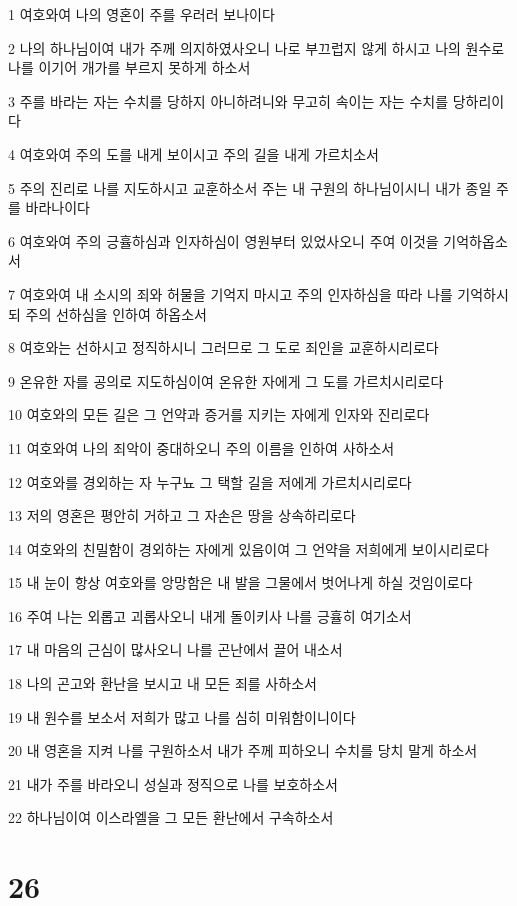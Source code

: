 \par 1 여호와여 나의 영혼이 주를 우러러 보나이다
\par 2 나의 하나님이여 내가 주께 의지하였사오니 나로 부끄럽지 않게 하시고 나의 원수로 나를 이기어 개가를 부르지 못하게 하소서
\par 3 주를 바라는 자는 수치를 당하지 아니하려니와 무고히 속이는 자는 수치를 당하리이다
\par 4 여호와여 주의 도를 내게 보이시고 주의 길을 내게 가르치소서
\par 5 주의 진리로 나를 지도하시고 교훈하소서 주는 내 구원의 하나님이시니 내가 종일 주를 바라나이다
\par 6 여호와여 주의 긍휼하심과 인자하심이 영원부터 있었사오니 주여 이것을 기억하옵소서
\par 7 여호와여 내 소시의 죄와 허물을 기억지 마시고 주의 인자하심을 따라 나를 기억하시되 주의 선하심을 인하여 하옵소서
\par 8 여호와는 선하시고 정직하시니 그러므로 그 도로 죄인을 교훈하시리로다
\par 9 온유한 자를 공의로 지도하심이여 온유한 자에게 그 도를 가르치시리로다
\par 10 여호와의 모든 길은 그 언약과 증거를 지키는 자에게 인자와 진리로다
\par 11 여호와여 나의 죄악이 중대하오니 주의 이름을 인하여 사하소서
\par 12 여호와를 경외하는 자 누구뇨 그 택할 길을 저에게 가르치시리로다
\par 13 저의 영혼은 평안히 거하고 그 자손은 땅을 상속하리로다
\par 14 여호와의 친밀함이 경외하는 자에게 있음이여 그 언약을 저희에게 보이시리로다
\par 15 내 눈이 항상 여호와를 앙망함은 내 발을 그물에서 벗어나게 하실 것임이로다
\par 16 주여 나는 외롭고 괴롭사오니 내게 돌이키사 나를 긍휼히 여기소서
\par 17 내 마음의 근심이 많사오니 나를 곤난에서 끌어 내소서
\par 18 나의 곤고와 환난을 보시고 내 모든 죄를 사하소서
\par 19 내 원수를 보소서 저희가 많고 나를 심히 미워함이니이다
\par 20 내 영혼을 지켜 나를 구원하소서 내가 주께 피하오니 수치를 당치 말게 하소서
\par 21 내가 주를 바라오니 성실과 정직으로 나를 보호하소서
\par 22 하나님이여 이스라엘을 그 모든 환난에서 구속하소서

\chapter{26}

